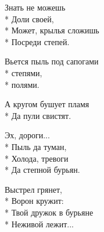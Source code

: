 \medskip

\begin{minipage}{\linewidth}
Знать не можешь\\*
Доли своей,\\*
Может, крылья сложишь\\*
Посреди степей.\\
\end{minipage}\par\medskip\nobreak

\medskip

\begin{minipage}{\linewidth}
Вьется пыль под сапогами\\*
степями,\\*
полями.\\
\end{minipage}\par\medskip\nobreak

\medskip

\begin{minipage}{\linewidth}
А кругом бушует пламя\\*
Да пули свистят.\\
\end{minipage}\par\medskip\nobreak

\medskip

\begin{minipage}{\linewidth}
\hspace*{1.5em}Эх, дороги...\\*
\hspace*{1.5em}Пыль да туман,\\*
\hspace*{1.5em}Холода, тревоги\\*
\hspace*{1.5em}Да степной бурьян.\\
\end{minipage}\par\medskip\nobreak

\medskip

\begin{minipage}{\linewidth}
Выстрел грянет,\\*
Ворон кружит:\\*
Твой дружок в бурьяне\\*
Неживой лежит...\\
\end{minipage}\par\medskip\nobreak

